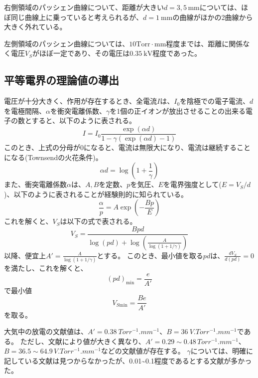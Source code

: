 \documentclass[a4paper]{ltjsarticle}
\begin{document}
右側領域のパッシェン曲線について、距離が大きい$d=3, 5\,\si{\milli\meter}$については、ほぼ同じ曲線上に乗っていると考えられるが、$d=\SI{1}{\milli\meter}$の曲線がほかの2曲線から大きく外れている。

左側領域のパッシェン曲線については、$10\text{Torr}\cdot\si{\milli\meter}$程度までは、距離に関係なく電圧$V_S$がほぼ一定であり、その電圧は$\SI{0.35}{\kilo\volt}$程度であった。

\subsection{平等電界の理論値の導出}
電圧が十分大きく、\gamma 作用が存在するとき、全電流$I$は、$I_0$を陰極での電子電流、$d$を電極間隔、$\alpha$を衝突電離係数、$\gamma$を1個の正イオンが放出させることの出来る電子の数とすると、以下のように表される。
\begin{equation}
    I = I_0\frac{\exp(\alpha d)}{1-\gamma\left(\exp(\alpha d)-1\right)}
\end{equation}
このとき、上式の分母が0になると、電流は無限大になり、電流は継続することになる(Townsendの火花条件)。
\begin{equation}
    \alpha d = \log(1+\frac{1}{\gamma}) \label{eq:townsend}
\end{equation}
また、衝突電離係数$\alpha$は、$A, B$を定数、$p$を気圧、$E$を電界強度として($E = V_S/d$)、以下のように表されることが経験則的に知られている。
\begin{equation}
    \frac{\alpha}{p} = A\exp(-\frac{Bp}{E}) \label{eq:alpha}
\end{equation}
これを解くと、$V_S$は以下の式で表される。
\begin{equation}
    V_S = \frac{Bpd}{\log(pd) + \log\left(\frac{A}{\log\left(1+1/\gamma\right)}\right)}
\end{equation}
以降、便宜上$A' = \frac{A}{\log(1+1/\gamma)}$とする。
このとき、最小値を取る$pd$は、$\frac{dV_S}{d(pd)} = 0$を満たし、これを解くと、
\begin{equation}
    (pd)_{\text{min}} = \frac{e}{A'}
\end{equation}
で最小値
\begin{equation}
    V_{S\text{min}} = \frac{Be}{A'}
\end{equation}
を取る。

大気中の放電の文献値は、$A'=\SI{0.38}{Torr^{-1}.mm^{-1}}$、$B=\SI{36}{V.Torr^{-1}.mm^{-1}}$である\cite{Report 1}。
ただし、文献により値が大きく異なり、$A'=0.29\sim0.48\,\si{Torr^{-1}.mm^{-1}}$、$B=36.5\sim64.9\,\si{V.Torr^{-1}.mm^{-1}}$などの文献値が存在する\cite{Report 2}。
$\gamma$については、明確に記している文献は見つからなかったが、0.01\sim0.1程度であるとする文献が多かった\cite{Journal 1}。
\end{document}

